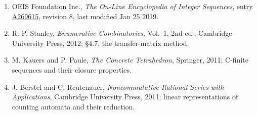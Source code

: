 \documentclass[11pt]{article}
\theoremstyle{definition}
\begin{document}
\begin{enumerate}

\item OEIS Foundation Inc., \emph{The On-Line Encyclopedia of Integer Sequences}, entry \href{https://oeis.org/A269615}{A269615}, revision 8, last modified Jan 25 2019.

\item R. P. Stanley, \emph{Enumerative Combinatorics}, Vol.~1, 2nd ed., Cambridge University Press, 2012; \S4.7, the transfer-matrix method.

\item M. Kauers and P. Paule, \emph{The Concrete Tetrahedron}, Springer, 2011; C-finite sequences and their closure properties.

\item J. Berstel and C. Reutenauer, \emph{Noncommutative Rational Series with Applications}, Cambridge University Press, 2011; linear representations of counting automata and their reduction.

\end{enumerate}
\end{document}
